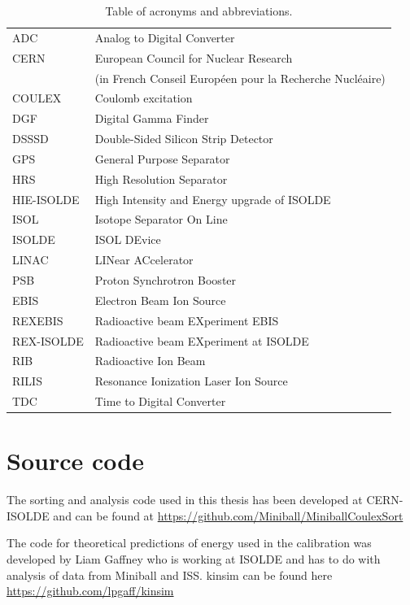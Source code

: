 \documentclass[twoside,english]{uiofysmaster/uiofysmaster}
\begin{document}
\begin{appendices}
\begin{table}[h]
  \centering
  \caption{Table of acronyms and abbreviations.}
    \begin{tabular}{ll}
        \hline
        ADC & Analog to Digital Converter \\
        CERN & European Council for Nuclear Research \\ 
         & (in French Conseil Européen pour la Recherche Nucléaire) \\
        COULEX & Coulomb excitation \\
        DGF & Digital Gamma Finder \\
        DSSSD & Double-Sided Silicon Strip Detector \\
        GPS & General Purpose Separator \\
        HRS & High Resolution Separator \\
        HIE-ISOLDE & High Intensity and Energy upgrade of ISOLDE \\
        ISOL & Isotope Separator On Line \\
        ISOLDE & ISOL DEvice \\
        LINAC & LINear ACcelerator \\
        PSB & Proton Synchrotron Booster \\
        EBIS & Electron Beam Ion Source \\
        REXEBIS & Radioactive beam EXperiment EBIS \\
        REX-ISOLDE & Radioactive beam EXperiment at ISOLDE \\
        RIB & Radioactive Ion Beam \\
        RILIS & Resonance Ionization Laser Ion Source \\
        TDC & Time to Digital Converter \\
        \hline
    \end{tabular}
    \label{tab:acro}
\end{table}


\chapter{Source code}
The sorting and analysis code used in this thesis has been developed at CERN-ISOLDE and can be found at \url{https://github.com/Miniball/MiniballCoulexSort}

The code for theoretical predictions of energy used in the calibration was developed by Liam Gaffney who is working at ISOLDE and has to do with analysis of data from Miniball and ISS. kinsim can be found here \url{https://github.com/lpgaff/kinsim}


\end{appendices}
\end{document}
